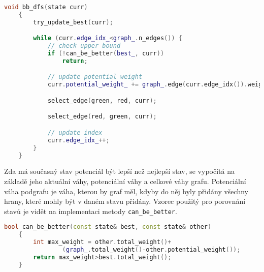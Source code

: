 \begin{lstlisting}[language=C++, label={lst:bb_dfs}, title={Metoda pro prohledávání stavového prostoru}]
    void bb_dfs(state curr)
    {
        try_update_best(curr);

        while (curr.edge_idx_<graph_.n_edges()) {
            // check upper bound
            if (!can_be_better(best_, curr))
                return;

            // update potential weight
            curr.potential_weight_ += graph_.edge(curr.edge_idx()).weight;

            select_edge(green, red, curr);

            select_edge(red, green, curr);

            // update index
            curr.edge_idx_++;
        }
    }
\end{lstlisting}

Zda má současný stav potenciál být lepší než nejlepší stav, se vypočítá na základě jeho aktuální váhy, potenciální váhy a celkové váhy grafu.
Potenciální váha podgrafu je váha, kterou by graf měl, kdyby do něj byly přidány všechny hrany, které mohly být v daném stavu přidány.
Vzorec použitý pro porovnání stavů je vidět na implementaci metody \texttt{can\_be\_better}.

\begin{lstlisting}[language=C++, label={lst:can_be_better}, title={Metoda pro ořezávání shora}]
    bool can_be_better(const state& best, const state& other)
    {
        int max_weight = other.total_weight()+
                (graph_.total_weight()-other.potential_weight());
        return max_weight>best.total_weight();
    }
\end{lstlisting}






